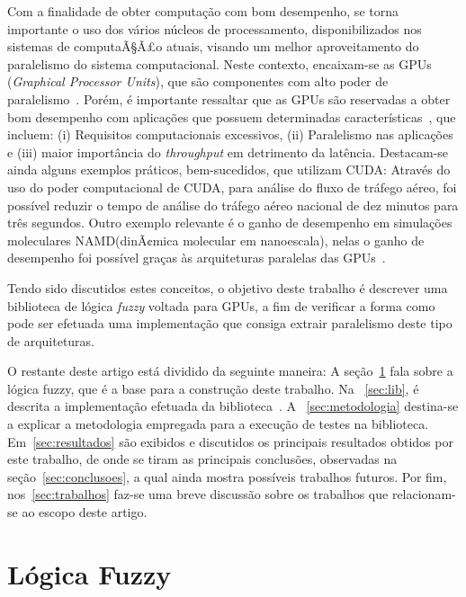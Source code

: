 \documentclass[12pt]{article}
\begin{document}
	Com a finalidade de obter computação com bom desempenho, se torna importante o uso dos vários núcleos de processamento, disponibilizados nos sistemas de computaÃ§Ã£o atuais, visando um melhor aproveitamento do paralelismo do sistema computacional. Neste contexto, encaixam-se as GPUs (\textit{Graphical Processor Units}), que são componentes com alto poder de paralelismo~\cite{sengupta:07}. Porém, é importante ressaltar que as GPUs são reservadas a obter bom desempenho com aplicações que possuem determinadas características~\cite{owens:08}, que incluem: (i) Requisitos computacionais excessivos, (ii) Paralelismo nas aplicações e (iii) maior importância do \textit{throughput} em detrimento da latência. Destacam-se ainda alguns exemplos práticos, bem-sucedidos, que utilizam CUDA:
Através do uso do poder computacional de CUDA, para análise do fluxo de tráfego aéreo, foi possível reduzir o tempo de análise do tráfego aéreo nacional de dez minutos para três segundos. Outro exemplo relevante é o ganho de desempenho em simulações moleculares NAMD(dinÃ¢mica molecular em nanoescala), nelas o ganho de desempenho foi possível graças às arquiteturas paralelas das GPUs~\cite{nvidia:15}.


	Tendo sido discutidos estes conceitos, o objetivo deste trabalho é descrever uma biblioteca de lógica \textit{fuzzy} voltada para GPUs, a fim de verificar a forma como pode ser efetuada uma implementação que consiga extrair paralelismo deste tipo de arquiteturas.
	

	O restante deste artigo está dividido da seguinte maneira: A seção~\ref{sec:logfuzzy} fala sobre a lógica fuzzy, que é a base para a construção deste trabalho. Na ~\ref{sec:lib}, é descrita a implementação efetuada da biblioteca~\libname. A ~\ref{sec:metodologia} destina-se a explicar a metodologia empregada para a execução de testes na biblioteca. Em~\ref{sec:resultados} são exibidos e discutidos os principais resultados obtidos por este trabalho, de onde se tiram as principais conclusões, observadas na seção~\ref{sec:conclusoes}, a qual ainda mostra possíveis trabalhos futuros. Por fim, nos~\ref{sec:trabalhos} faz-se uma breve discussão sobre os trabalhos que relacionam-se ao escopo deste artigo.

\section{Lógica Fuzzy}
\label{sec:logfuzzy}
\end{document}

